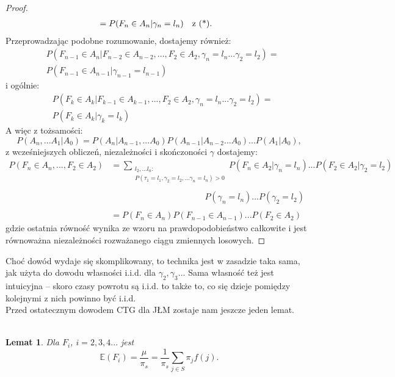 \documentclass[a4paper]{article}
\theoremstyle{defn}
\theoremstyle{theorem}
\theoremstyle{lemma}
\newtheorem{lemma}[defn]{Lemat}
\theoremstyle{cor}
\theoremstyle{fact}
\begin{document}
\begin{proof}
\begin{align*}
    &= P(F_n \in A_n | \gamma_n = l_n) \text{\quad z (*).}
\end{align*}
Przeprowadzając podobne rozumowanie, dostajemy również:
\begin{align*}
&P(F_{n-1} \in A_n|F_{n-2} \in A_{n-2},  ..., F_2 \in A_2, \gamma_n = l_n ... \gamma_2 = l_2) =\\ & P(F_{n-1} \in A_{n-1} | \gamma_{n-1} = l_{n-1})
\end{align*}
i ogólnie:
\begin{align*}
&P(F_{k} \in A_k|F_{k-1} \in A_{k-1},  ..., F_2 \in A_2, \gamma_n = l_n ... \gamma_2 = l_2) =\\ & P(F_{k} \in A_{k} | \gamma_{k} = l_{k})
\end{align*}
A więc z tożsamości:
$$P(A_n, ... A_1|A_0) = P(A_n|A_{n-1}, ...A_0)P(A_{n-1}|A_{n-2}...A_0)...P(A_1|A_0),$$
z wcześniejszych obliczeń, niezależności i skończoności $\gamma$ dostajemy:
\begin{align*}
    P(F_n \in A_n, ..., F_2 \in A_2) &= \sum\limits_{\substack{l_2, ... l_n:\\P(\tau_1 = l_1, \gamma_2 = l_2, ... \gamma_n = l_n) > 0}} P(F_n \in A_2|\gamma_n = l_n) ... P(F_2 \in A_2|\gamma_2 = l_2)\\\\
    &\quad\quad\quad\quad\quad\quad\quad\quad\quad\quad\quad P(\gamma_n = l_n) ... P(\gamma_2 = l_2)\\\\
    &= P(F_n \in A_n)P(F_{n-1} \in A_{n-1}) ... P(F_2 \in A_2)
\end{align*}
gdzie ostatnia równość wynika ze wzoru na prawdopodobieństwo całkowite i jest równoważna niezależności rozważanego ciągu zmiennych losowych.
\end{proof}
Choć dowód wydaje się skomplikowany, to technika jest w zasadzie taka sama, jak użyta do dowodu własności i.i.d. dla $\gamma_2, \gamma_3 ...$ Sama własność też jest intuicyjna – skoro czasy powrotu są i.i.d. to także to, co się dzieje pomiędzy kolejnymi z nich powinno być i.i.d.\\
Przed ostatecznym dowodem CTG dla JŁM zostaje nam jeszcze jeden lemat.\\
\\
\begin{lemma}\label{lemma2.6.4}
Dla $F_i$, $i=2,3,4...$ jest
$$\mathbb{E}(F_i) = \frac{\mu}{\pi_s} = \frac{1}{\pi_s}\sum\limits_{j \in S} \pi_j f(j).$$
\end{lemma}
\end{document}
